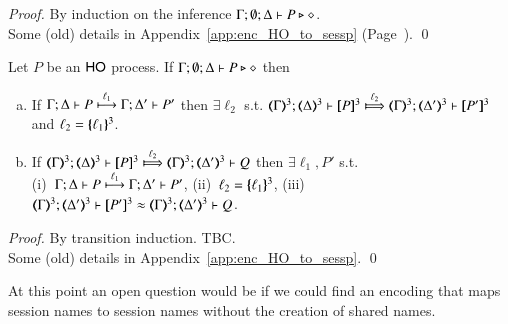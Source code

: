 \begin{proof}
By induction on the inference $\Gamma; \emptyset; \Delta \proves P \hastype \Proc$. \\
Some (old) details in Appendix~\ref{app:enc_HO_to_sessp} (Page~\pageref{app:enc_HO_to_sessp}).
	\qed
\end{proof}

\begin{proposition}
Let $P$ be an  $\HO$ process.
If $\Gamma; \emptyset; \Delta \proves P \hastype \Proc$ then
		\begin{enumerate}[a)]
			\item	 
			   If  $\stytra{\Gamma}{\ell_1}{\Delta}{P}{\Delta'}{P'}$
			   then  $\exists \ell_2$ s.t. 
			    $\wtytra{\mapt{\Gamma}^{3}}{\ell_2}{\mapt{\Delta}^{3}}{\map{P}^{3}}{\mapt{\Delta'}^{3}}{\map{P'}^{3}}$
			    and $\ell_2 = \mapa{\ell_1}^{3}$.
			\item   
			If  $\wtytra{\mapt{\Gamma}^{3}}{\ell_2}{\mapt{\Delta}^{3}}{\map{P}^{3}}{\mapt{\Delta'}^{3}}{Q}$
			   then $\exists \ell_1, P'$ s.t.  \\
			    (i)~$\stytra{\Gamma}{\ell_1}{\Delta}{P}{\Delta'}{P'}$,
			    (ii)~$\ell_2 = \mapa{\ell_1}^{3}$, 
			    (iii)~$\wbb{\mapt{\Gamma}^{3}}{\ell}{\mapt{\Delta'}^{3}}{\map{P'}^{3}}{\mapt{\Delta'}^{3}}{Q}$.
			    \end{enumerate}
\end{proposition}

\begin{proof}
By transition induction. TBC. \\
Some (old) details in Appendix~\ref{app:enc_HO_to_sessp}.
	\qed
\end{proof}

\begin{comment}
\begin{proof}[Sketch]
For completeness, we 
consider the \HO process $P = {\bbout{k}{\abs{x} Q} P_1} \Par \binp{k}{X} P_2$. We have that
\[
P \red P_1 \Par P_2 \subst{\abs{x}Q}{X}
\]
In the target language, this reduction is mimicked as follows:
\begin{eqnarray*}
\pmap{P}{2} & = & \newsp{a}{\bout{k}{a} (\pmap{P_1}{3} \Par \repl{} \binp{a}{y} \binp{y}{x} \pmap{Q}{3})\,} 
                  \Par \binp{k}{x} \pmap{P_2}{3} \\
            & \red & \newsp{a}{\pmap{P_1}{3} \Par \repl{} \binp{a}{y} \binp{y}{x} \pmap{Q}{3} 
                  \Par  \pmap{P_2}{3}\subst{a}{x}}
\end{eqnarray*}
\qed
\end{proof}
\end{comment}


At this point an open  question would be if we could find an encoding that maps
session names to session names without the creation of shared names.


